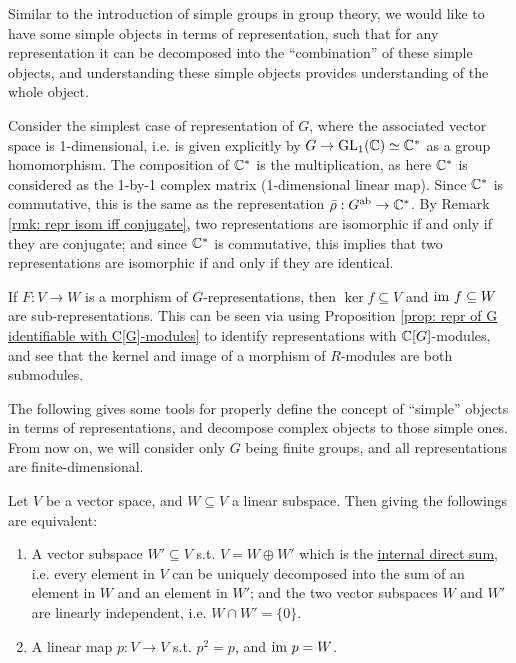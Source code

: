 \documentclass{article}
\begin{document}
\textstart
Similar to the introduction of simple groups in group theory, we would like to have some simple objects in terms of representation, such that for any representation it can be decomposed into the ``combination'' of these simple objects, and understanding these simple objects provides understanding of the whole object. 

Consider the simplest case of representation of $G$, where the associated vector space is 1-dimensional, i.e. is given explicitly by $G \to \mathrm{GL}_1(\mathbb{C}) \simeq \mathbb{C}^{\ast}$ as a group homomorphism. The composition of $\mathbb{C}^{\ast}$ is the multiplication, as here $\mathbb{C}^{\ast}$ is considered as the 1-by-1 complex matrix (1-dimensional linear map). Since $\mathbb{C}^{\ast}$ is commutative, this is the same as the representation $\bar{\rho}: G^{\mathrm{ab}} \to \mathbb{C}^{\ast}$. By Remark \ref{rmk: repr isom iff conjugate}, two representations are isomorphic if and only if they are conjugate; and since $\mathbb{C}^{\ast}$ is commutative, this implies that two representations are isomorphic if and only if they are identical.

\begin{corollary}\label{cor: kernel and image of morphism of repr. is repr.}
    If $F: V \to W$ is a morphism of $G$-representations, then $\ker f \subseteq V$ and $\mathrm{im}\  f \subseteq W$ are sub-representations. This can be seen via using Proposition \ref{prop: repr of G identifiable with C[G]-modules} to identify representations with $\mathbb{C}[G]$-modules, and see that the kernel and image of a morphism of $R$-modules are both submodules. 
\end{corollary}

The following gives some tools for properly define the concept of ``simple'' objects in terms of representations, and decompose complex objects to those simple ones. From now on, we will consider only $G$ being finite groups, and all representations are finite-dimensional.

\begin{parenthesis}\label{pth: equiv in v.s. for internal sum and projection}
    Let $V$ be a vector space, and $W \subseteq V$ a linear subspace. Then giving the followings are equivalent:
    \begin{enumerate}[label=\arabic*)]
        \item A vector subspace $W' \subseteq V$ s.t. $V = W \oplus W'$ which is the \underline{internal direct sum}, i.e. every element in $V$ can be uniquely decomposed into the sum of an element in $W$ and an element in $W'$; and the two vector subspaces $W$ and $W'$ are linearly independent, i.e. $W \cap W' = \{0\}$.
        \item A linear map $p: V \to V$ s.t. $p^2 = p$, and $\mathrm{im}\  p = W$.
    \end{enumerate}
\end{parenthesis}
\end{document}
